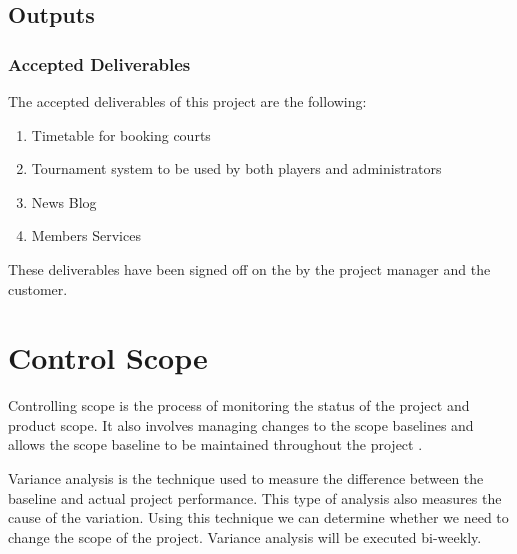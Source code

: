 \subsection{Outputs}

\subsubsection{Accepted Deliverables}

The accepted deliverables of this project are the following:
\begin{enumerate}
\item Timetable for booking courts
\item Tournament system to be used by both players and administrators
\item News Blog
\item Members Services
\end{enumerate}

These deliverables have been signed off on the by the project manager and the customer.

\section{Control Scope}

Controlling scope is the process of monitoring the status of the project and product scope. It also involves managing changes to the scope baselines and allows the scope baseline to be maintained throughout the project \parencite{pmbok}.

Variance analysis is the technique used to measure the difference between the baseline and actual project performance. This type of analysis also measures the cause of the variation. Using this technique we can determine whether we need to change the scope of the project. Variance analysis will be executed bi-weekly.
